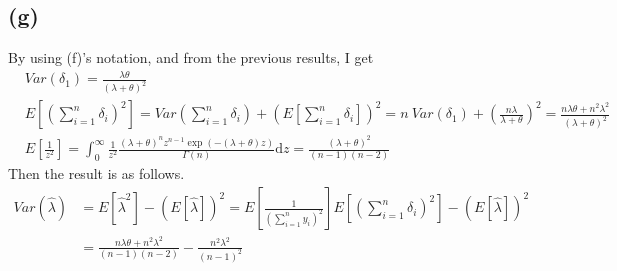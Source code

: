 \documentclass{article}
\begin{document}
\subsection{(g)}
By using (f)'s notation, and from the previous results, I get 
\begin{align*}
	&Var(\delta_1) = \frac{\lambda\theta}{(\lambda+\theta)^2}\\[10pt]
	&E[(\sum_{i=1}^n \delta_i)^2] = Var(\sum_{i=1}^n \delta_i) + (E[\sum_{i=1}^n \delta_i])^2 = n\ Var(\delta_1) + (\frac{n\lambda}{\lambda+\theta})^2 = \frac{n\lambda\theta + n^2\lambda^2}{(\lambda+\theta)^2}\\[10pt]
	&E\left[ \frac{1}{z^2}\right] = \int_0^{\infty} \frac{1}{z^2} \frac{(\lambda+\theta)^n z^{n-1} \exp(-(\lambda+\theta)z)}{\Gamma(n)} \mathrm{d}z = \frac{(\lambda+\theta)^2}{(n-1)(n-2)}
\end{align*}
Then the result is as follows.
\begin{align*}
	Var(\hat{\lambda}) &= E[\hat{\lambda}^2] - (E[\hat{\lambda}])^2 = E\left[ \frac{1}{(\sum_{i=1}^n y_i)^2} \right] E[(\sum_{i=1}^n \delta_i)^2] - (E[\hat{\lambda}])^2\\
	&= \frac{n\lambda\theta + n^2 \lambda^2}{(n-1)(n-2)} - \frac{n^2\lambda^2}{(n-1)^2}
\end{align*}
\end{document}
